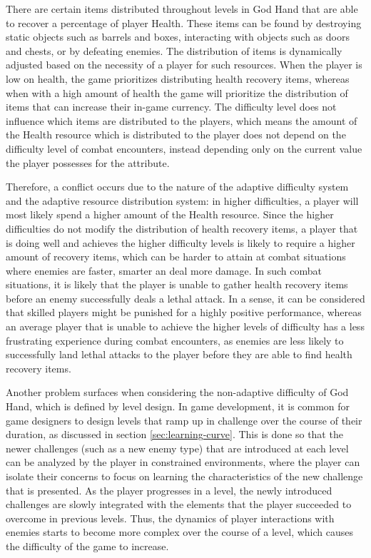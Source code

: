There are certain items distributed throughout levels in God Hand that are able to recover a percentage of player Health. These items can be found by destroying static objects such as barrels and boxes, interacting with objects such as doors and chests, or by defeating enemies. The distribution of items is dynamically adjusted based on the necessity of a player for such resources. When the player is low on health, the game prioritizes distributing health recovery items, whereas when with a high amount of health the game will prioritize the distribution of items that can increase their in-game currency. The difficulty level does not influence which items are distributed to the players, which means the amount of the Health resource which is distributed to the player does not depend on the difficulty level of combat encounters, instead depending only on the current value the player possesses for the attribute. 

Therefore, a conflict occurs due to the nature of the adaptive difficulty system and the adaptive resource distribution system: in higher difficulties, a player will most likely spend a higher amount of the Health resource. Since the higher difficulties do not modify the distribution of health recovery items, a player that is doing well and achieves the higher difficulty levels is likely to require a higher amount of recovery items, which can be harder to attain at combat situations where enemies are faster, smarter an deal more damage. In such combat situations, it is likely that the player is unable to gather health recovery items before an enemy successfully deals a lethal attack. In a sense, it can be considered that skilled players might be punished for a highly positive performance, whereas an average player that is unable to achieve the higher levels of difficulty has a less frustrating experience during combat encounters, as enemies are less likely to successfully land lethal attacks to the player before they are able to find health recovery items.

Another problem surfaces when considering the non-adaptive difficulty of God Hand, which is defined by level design. In game development, it is common for game designers to design levels that ramp up in challenge over the course of their duration, as discussed in section \ref{sec:learning-curve}. This is done so that the newer challenges (such as a new enemy type) that are introduced at each level can be analyzed by the player in constrained environments, where the player can isolate their concerns to focus on learning the characteristics of the new challenge that is presented. As the player progresses in a level, the newly introduced challenges are slowly integrated with the elements that the player succeeded to overcome in previous levels. Thus, the dynamics of player interactions with enemies starts to become more complex over the course of a level, which causes the difficulty of the game to increase.

